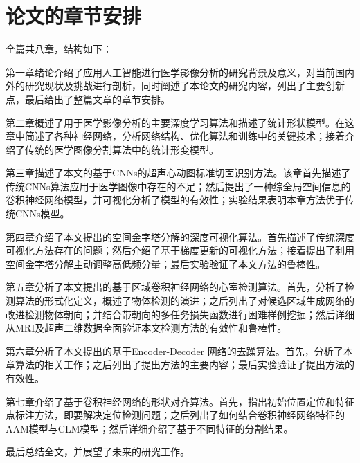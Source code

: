 \section{论文的章节安排}

全篇共八章，结构如下：

第一章绪论介绍了应用人工智能进行医学影像分析的研究背景及意义，对当前国内外的研究现状及挑战进行剖析，同时阐述了本论文的研究内容，列出了主要创新点，最后给出了整篇文章的章节安排。

第二章概述了用于医学影像分析的主要深度学习算法和描述了统计形状模型。在这章中简述了各种神经网络，分析网络结构、优化算法和训练中的关键技术；接着介绍了传统的医学图像分割算法中的统计形变模型。

第三章描述了本文的基于CNNs的超声心动图标准切面识别方法。该章首先描述了传统CNNs算法应用于医学图像中存在的不足；然后提出了一种综全局空间信息的卷积神经网络模型，并可视化分析了模型的有效性；实验结果表明本章方法优于传统CNNs模型。

第四章介绍了本文提出的空间金字塔分解的深度可视化算法。首先描述了传统深度可视化方法存在的问题；然后介绍了基于梯度更新的可视化方法；接着提出了利用空间金字塔分解主动调整高低频分量；最后实验验证了本文方法的鲁棒性。

第五章分析了本文提出的基于区域卷积神经网络的心室检测算法。首先，分析了检测算法的形式化定义，概述了物体检测的演进；之后列出了对候选区域生成网络的改进检测物体朝向；并结合带朝向的多任务损失函数进行困难样例挖掘；然后详细从MRI及超声二维数据全面验证本文检测方法的有效性和鲁棒性。

第六章分析了本文提出的基于Encoder-Decoder 网络的去躁算法。首先，分析了本章算法的相关工作；之后列出了提出方法的主要内容；最后实验验证了提出方法的有效性。

第七章介绍了基于卷积神经网络的形状对齐算法。首先，指出初始位置定位和特征点标注方法，即要解决定位检测问题；之后列出了如何结合卷积神经网络特征的AAM模型与CLM模型；然后详细介绍了基于不同特征的分割结果。

最后总结全文，并展望了未来的研究工作。